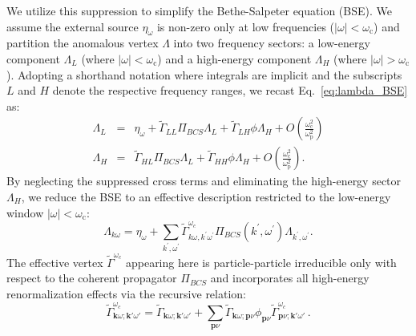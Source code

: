 \documentclass[%
 reprint,
superscriptaddress,
 amsmath,amssymb,
 aps,
prx,
]{revtex4-2}
\newcommand{\oldver}[1]{{\color{gray} #1}}
\newcommand{\Gammapp}{\tilde{\Gamma}}
\begin{document}
We utilize this suppression to simplify the Bethe-Salpeter equation (BSE). We assume the external source $\eta_\omega$ is non-zero only at low frequencies ($|\omega| < \omega_{\text{c}}$) and partition the anomalous vertex $\Lambda$ into two frequency sectors: a low-energy component $\Lambda_L$ (where $|\omega| < \omega_{\text{c}}$) and a high-energy component $\Lambda_H$ (where $|\omega| > \omega_{\text{c}}$). Adopting a shorthand notation where integrals are implicit and the subscripts $L$ and $H$ denote the respective frequency ranges, we recast Eq.~\ref{eq:lambda_BSE} as:
\begin{eqnarray}
\Lambda_L&=&\eta_\omega+\tilde{\Gamma}_{LL}\Pi_{BCS}\Lambda_L+\tilde{\Gamma}_{LH}\phi\Lambda_H+O\left(\frac{\omega_{\text{c}}^2}{\omega_{\text{p}}^2}\right)
\nonumber
\\
\Lambda_H&=&\tilde{\Gamma}_{HL}\Pi_{BCS}\Lambda_L+\tilde{\Gamma}_{HH}\phi\Lambda_H+O\left(\frac{\omega_{\text{c}}^2}{\omega_{\text{p}}^2}\right).
\label{eq:BSE2}
\end{eqnarray}
By neglecting the suppressed cross terms and eliminating the high-energy sector $\Lambda_H$, we reduce the BSE to an effective description restricted to the low-energy window $|\omega| < \omega_{\text{c}}$:
\begin{equation}
\Lambda_{k\omega}=\eta_\omega+\sum_{k^\prime,\omega^\prime}\tilde{\Gamma}^{\omega_c}_{k\omega,k^\prime\omega^\prime}\Pi_{BCS}(k^\prime,\omega^\prime)\Lambda_{k^\prime,\omega^\prime}.
\label{eq:BSElow}
\end{equation}
The effective vertex $\tilde{\Gamma}^{\omega_c}$ appearing here is particle-particle irreducible only with respect to the coherent propagator $\Pi_{BCS}$ and incorporates all high-energy renormalization effects via the recursive relation:
\begin{equation}
\label{eq:effective_gamma}
    \tilde{\Gamma}^{\omega_c}_{\mathbf{k}\omega;\mathbf{k}'\omega'} = \Gammapp_{\mathbf{k}\omega;\mathbf{k}'\omega'} + \sum_{\mathbf{p}\nu}\Gammapp_{\mathbf{k}\omega;\mathbf{p}\nu}  \phi_{\mathbf{p}\nu} \tilde{\Gamma}^{\omega_c}_{\mathbf{p}\nu;\mathbf{k}'\omega'} \, .
\end{equation}


\end{document}
